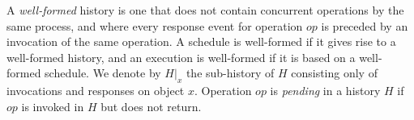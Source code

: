 A \emph{well-formed} history is one that does not contain concurrent operations by the same process, and
where every response event for operation $op$ is preceded by an invocation of the same operation.
A schedule is well-formed if it gives rise to a well-formed history, and an execution
is well-formed if it is based on a well-formed schedule.
We denote by $H|_x$ the sub-history of $H$ consisting only of invocations and responses
on object $x$. Operation $op$ is \emph{pending} in a history $H$ if $op$ is invoked
in $H$ but does not return.






